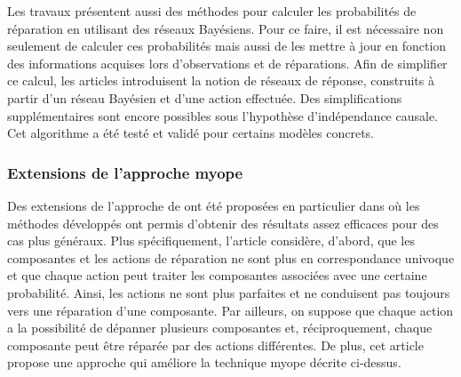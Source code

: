 \documentclass[a4paper,11pt]{article}
\theoremstyle{plain}
\theoremstyle{definition}
\begin{document}
Les travaux \cite{heckerman1994troubleshooting, Heckerman_1995} présentent aussi des méthodes pour calculer les probabilités de réparation en utilisant des réseaux Bayésiens. Pour ce faire, il est nécessaire non seulement de calculer ces probabilités mais aussi de les mettre à jour en fonction des informations acquises lors d'observations et de réparations. Afin de simplifier ce calcul, les articles introduisent la notion de réseaux de réponse, construits à partir d'un réseau Bayésien et d'une action effectuée. Des simplifications supplémentaires sont encore possibles sous l'hypothèse d'indépendance causale. Cet algorithme a été testé et validé pour certains modèles concrets.

%

\subsubsection{Extensions de l'approche myope}

Des extensions de l'approche de \cite{heckerman1994troubleshooting, Heckerman_1995} ont été proposées en particulier dans \cite{Jensen_2001, Langseth_2003} où les méthodes développés ont permis d'obtenir des résultats assez efficaces pour des cas plus généraux. Plus spécifiquement, l'article \cite{Jensen_2001} considère, d'abord, que les composantes et les actions de réparation ne sont plus en correspondance univoque et que chaque action peut traiter les composantes associées avec une certaine probabilité. Ainsi, les actions ne sont plus parfaites et ne conduisent pas toujours vers une réparation d'une composante. Par ailleurs, on suppose que chaque action a la possibilité de dépanner plusieurs composantes et, réciproquement, chaque composante peut être réparée par des actions différentes. De plus, cet article propose une approche qui améliore la technique myope décrite ci-dessus. %
\end{document}
